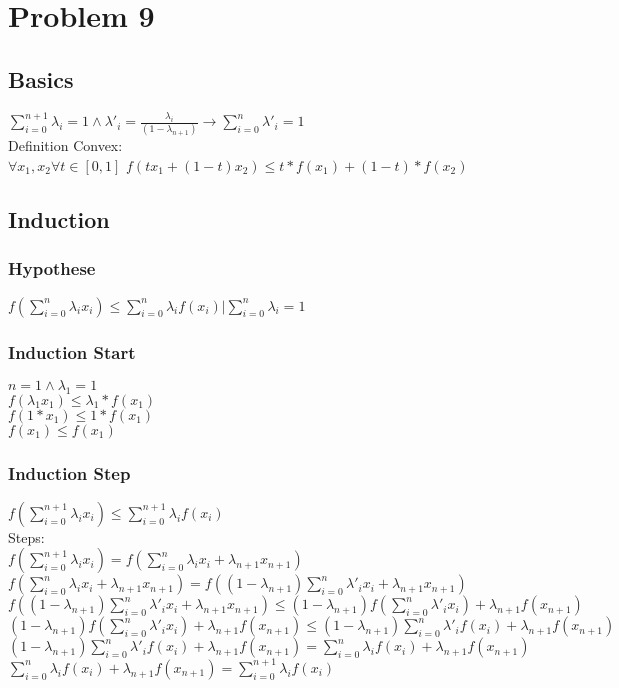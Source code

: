 \section{Problem 9}
\subsection{Basics}
$\sum_{i=0}^{n+1} {\lambda_i} = 1  \wedge \lambda'_i = \frac{\lambda_i}{(1-\lambda_{n+1})} \rightarrow \sum_{i=0}^{n} {\lambda'_i} = 1  $ \\ 
Definition Convex: \\ 
$\forall x_1, x_2  \forall t \in [0,1]$ $ f(tx_1 + (1-t) x_2) \leq t*f(x_1) +(1-t)*f(x_2) $
\subsection{Induction}
\subsubsection{Hypothese}
$ f(\sum_{i=0}^{n} {\lambda_i x_i} ) \leq \sum_{i=0}^{n} {\lambda_i f(x_i)} | \sum_{i=0}^{n} {\lambda_i} = 1 $
\subsubsection{Induction Start}
$n = 1 \wedge \lambda_1 = 1 $ \\
$f(\lambda_1x_1) \leq \lambda_1 * f(x_1) $ \\
$f(1*x_1) \leq 1 * f(x_1) $ \\
$f(x_1) \leq f(x_1) $

\subsubsection{Induction Step}

$ f(\sum_{i=0}^{n+1} {\lambda_i x_i} ) \leq \sum_{i=0}^{n+1} {\lambda_i f(x_i)}  $ \\
Steps:\\
$   f(\sum_{i=0}^{n+1} {\lambda_i x_i} )  = f(\sum_{i=0}^{n} {\lambda_i x_i} + \lambda_{n+1}x_{n+1} ) $\\
$f(\sum_{i=0}^{n} {\lambda_i x_i} + \lambda_{n+1}x_{n+1} ) = f((1-\lambda_{n+1}) \sum_{i=0}^{n} {\lambda'_i x_i} + \lambda_{n+1}x_{n+1} )  $\\
$f((1-\lambda_{n+1}) \sum_{i=0}^{n} {\lambda'_i x_i} + \lambda_{n+1}x_{n+1} ) \leq (1-\lambda_{n+1}) f(\sum_{i=0}^{n} {\lambda'_i x_i}) + \lambda_{n+1}f(x_{n+1})$\\ 
$(1-\lambda_{n+1}) f(\sum_{i=0}^{n} {\lambda'_i x_i}) + \lambda_{n+1}f(x_{n+1}) \leq (1-\lambda_{n+1}) \sum_{i=0}^{n} {\lambda'_i f(x_i)} + \lambda_{n+1}f(x_{n+1})$\\
$(1-\lambda_{n+1}) \sum_{i=0}^{n} {\lambda'_i f(x_i)} + \lambda_{n+1}f(x_{n+1}) = \sum_{i=0}^{n} {\lambda_i f(x_i)} + \lambda_{n+1}f(x_{n+1})$\\
 $\sum_{i=0}^{n} {\lambda_i f(x_i)} + \lambda_{n+1}f(x_{n+1})= \sum_{i=0}^{n+1} {\lambda_i f(x_i)}$